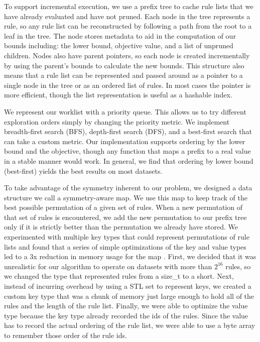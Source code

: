 \documentclass[format=sigconf]{acmart}
\begin{document}
To support incremental execution, we use a prefix tree to cache rule lists that we have already evaluated and have not pruned.
Each node in the tree represents a rule, so any rule list can be reconstructed by following a path from the root to a leaf in the tree.
The node stores metadata to aid in the computation of our bounds including: the lower bound, objective value, and a list of unpruned children.
Nodes also have parent pointers, so each node is created incrementally by using the parent's bounds to calculate the new bounds.
This structure also means that a rule list can be represented and passed around as a pointer to a single node in the tree or as an ordered list of rules.
In most cases the pointer is more efficient, though the list representation is useful as a hashable index.

We represent our worklist with a priority queue.
This allows us to try different exploration orders simply by changing the priority metric.
We implement breadth-first search (BFS), depth-first search (DFS), and a best-first search that can take a custom metric.
Our implementation supports ordering by the lower bound and the objective, though any function that maps a prefix to a real value in a stable manner would work.
In general, we find that ordering by lower bound (best-first) yields the best results on most datasets.

To take advantage of the symmetry inherent to our problem, we designed a data structure we call a symmetry-aware map.
We use this map to keep track of the best possible permutation of a given set of rules.
When a new permutation of that set of rules is encountered, we add the new permutation to our prefix tree only if it is strictly better than the permutation we already have stored.
We experimented with multiple key types that could represent permutations of rule lists and found that a series of simple optimizations of the key and value types led to a 3x reduction in memory usage for the map \cite{Larus-Stone17}.
First, we decided that it was unrealistic for our algorithm to operate on datasets with more than $2^16$ rules, so we changed the type that represented rules from a size\_t to a short.
Next, instead of incurring overhead by using a STL set to represent keys, we created a custom key type that was a chunk of memory just large enough to hold all of the rules and the length of the rule list.
Finally, we were able to optimize the value type because the key type already recorded the ids of the rules.
Since the value has to record the actual ordering of the rule list, we were able to use a byte array to remember those order of the rule ids.
\end{document}
